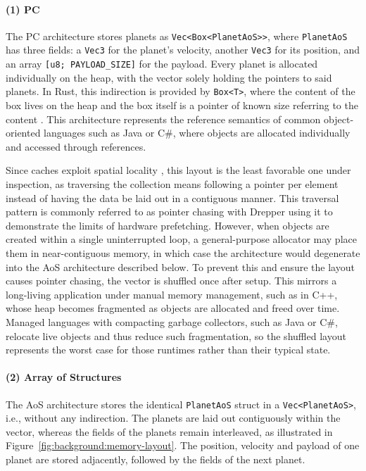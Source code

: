 \paragraph{(1) \ac{PC}}
The PC architecture stores planets as \texttt{Vec<Box<PlanetAoS>>}, where \texttt{PlanetAoS} has three fields: a \texttt{Vec3} for the planet's velocity, another \texttt{Vec3} for its position, and an array \mbox{\texttt{[u8;~PAYLOAD\_SIZE]}} for the payload. Every planet is allocated individually on the heap, with the vector solely holding the pointers to said planets. In Rust, this indirection is provided by \texttt{Box<T>}, where the content of the box lives on the heap and the box itself is a pointer of known size referring to the content \cite{klabnik2023rust}. This architecture represents the reference semantics of common object-oriented languages such as Java or C\#, where objects are allocated individually and accessed through references.

Since caches exploit spatial locality \cite{drepper2007every}, this layout is the least favorable one under inspection, as traversing the collection means following a pointer per element instead of having the data be laid out in a contiguous manner. This traversal pattern is commonly referred to as pointer chasing with Drepper \cite{drepper2007every} using it to demonstrate the limits of hardware prefetching. However, when objects are created within a single uninterrupted loop, a general-purpose allocator may place them in near-contiguous memory, in which case the architecture would degenerate into the \ac{AoS} architecture described below. To prevent this and ensure the layout causes pointer chasing, the vector is shuffled once after setup. This mirrors a long-living application under manual memory management, such as in C++, whose heap becomes fragmented as objects are allocated and freed over time. Managed languages with compacting garbage collectors, such as Java or C\#, relocate live objects and thus reduce such fragmentation, so the shuffled layout represents the worst case for those runtimes rather than their typical state.

\paragraph{(2) Array of Structures}
The \ac{AoS} architecture stores the identical \texttt{PlanetAoS} struct in a \texttt{Vec<PlanetAoS>}, i.e., without any indirection. The planets are laid out contiguously within the vector, whereas the fields of the planets remain interleaved, as illustrated in Figure~\ref{fig:background:memory-layout}. The position, velocity and payload of one planet are stored adjacently, followed by the fields of the next planet.

